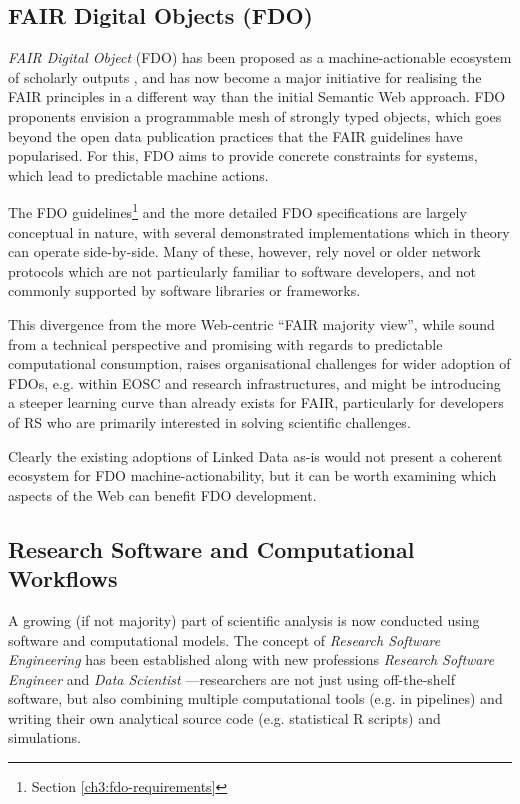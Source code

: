 \subsection{FAIR Digital Objects (FDO)}

\emph{FAIR Digital Object} (\acrshort{FDO}) has been proposed as a machine-actionable ecosystem of scholarly outputs \cite{Schultes 2019}, and has now become a major initiative for realising the \acrshort{FAIR} principles in a different way than the initial Semantic Web approach.
FDO proponents envision a programmable mesh of strongly typed objects, which goes beyond the open data publication practices that the FAIR guidelines have popularised.
For this, FDO aims to provide concrete constraints for systems, which lead to predictable machine actions.

The FDO guidelines\footnote{Section \vref{ch3:fdo-requirements}} \cite{Anders 2023} and the more detailed FDO specifications \cite{Ivonne 2023} are largely conceptual in nature, with several demonstrated implementations \cite{Wittenburg 2022a,Lannom 2022a} which in theory can operate side-by-side.
Many of these, however, rely novel or older network protocols \cite{Reilly 2009,Sun 2003a} which are not particularly familiar to software developers, and not commonly supported by software libraries or frameworks.

This divergence from the more Web-centric ``FAIR majority view'', while sound from a technical perspective and promising with regards to predictable computational consumption, raises organisational challenges for wider adoption of FDOs, e.g. within EOSC and research infrastructures, and might be introducing a steeper learning curve than already exists for FAIR, particularly for developers of \acrlong{RS} who are primarily interested in solving scientific challenges. 

Clearly the existing adoptions of Linked Data as-is would not present a coherent ecosystem for FDO machine-actionability, but it can be worth examining which aspects of the Web can benefit FDO development.


\subsection{Research Software and Computational Workflows}

A growing (if not majority) part of scientific analysis is now conducted using software and computational models.
The concept of \emph{Research Software Engineering} \cite{Cohen 2020} has been established along with new professions \emph{Research Software Engineer} \cite{Baxter 2012} and \emph{Data Scientist} \cite{van der Aalst 2014}---researchers are not just using off-the-shelf software, but also combining multiple computational tools (e.g. in pipelines) and writing their own analytical source code (e.g. statistical R scripts) and simulations.

